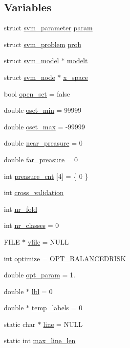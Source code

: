 \subsection*{Variables}
\begin{DoxyCompactItemize}
\item 
struct \hyperlink{structsvm__parameter}{svm\-\_\-parameter} \hyperlink{svm-train_8cpp_abef2e39cc4fa6cc6870dddf9afa2cfad}{param}
\item 
struct \hyperlink{structsvm__problem}{svm\-\_\-problem} \hyperlink{svm-train_8cpp_a3d3cd08abb1a582bcbb3095eb03ed0d6}{prob}
\item 
struct \hyperlink{structsvm__model}{svm\-\_\-model} $\ast$ \hyperlink{svm-train_8cpp_a0b730cfd99e9c8a2ece39a165ebcc5ef}{modelt}
\item 
struct \hyperlink{structsvm__node}{svm\-\_\-node} $\ast$ \hyperlink{svm-train_8cpp_aee6e5726660b16e12499d9bfa6eef01f}{x\-\_\-space}
\item 
bool \hyperlink{svm-train_8cpp_a17843ee1d8102ef588a3f997e827bc70}{open\-\_\-set} = false
\item 
double \hyperlink{svm-train_8cpp_a2bcd8955244b3b5ed1918acc0ce4014e}{oset\-\_\-min} = 99999
\item 
double \hyperlink{svm-train_8cpp_a6a83be17519c65392007b1449d5246e9}{oset\-\_\-max} = -\/99999
\item 
double \hyperlink{svm-train_8cpp_ab569b65ce2e86831530c897a3ad5c901}{near\-\_\-preasure} = 0
\item 
double \hyperlink{svm-train_8cpp_a57ce01656059264c677404c310f3a04e}{far\-\_\-preasure} = 0
\item 
int \hyperlink{svm-train_8cpp_aee8f27d5a82f967da296688aee11c230}{preasure\-\_\-cnt} \mbox{[}4\mbox{]} = \{ 0 \}
\item 
int \hyperlink{svm-train_8cpp_a3ed295b75b08a20ed2bbed4a67f8d18a}{cross\-\_\-validation}
\item 
int \hyperlink{svm-train_8cpp_a8e8ea59d1060e411ced9b25867c66651}{nr\-\_\-fold}
\item 
int \hyperlink{svm-train_8cpp_ad88594354ad0cd1b5f3cebf37f8381cf}{nr\-\_\-classes} = 0
\item 
F\-I\-L\-E $\ast$ \hyperlink{svm-train_8cpp_a32ca8324fdbaa5886494c3794aabb98e}{vfile} = N\-U\-L\-L
\item 
int \hyperlink{svm-train_8cpp_aa33cf9fcdc419d39c5d05fa458bf089a}{optimize} = \hyperlink{_2svm-train_8cpp_a534c2d1c329720ab36237c4d297a2b20}{O\-P\-T\-\_\-\-B\-A\-L\-A\-N\-C\-E\-D\-R\-I\-S\-K}
\item 
double \hyperlink{svm-train_8cpp_aea4397c2cc729e6e21e3eab9b9a2351e}{opt\-\_\-param} = 1.
\item 
double $\ast$ \hyperlink{svm-train_8cpp_a537df30cd5b5b576ee32aeffd22affe2}{lbl} = 0
\item 
double $\ast$ \hyperlink{svm-train_8cpp_a8d832079d5b980f5955dcd7afc689ba9}{temp\-\_\-labels} = 0
\item 
static char $\ast$ \hyperlink{svm-train_8cpp_a8adb30f4f6669f927fd9232f686c637b}{line} = N\-U\-L\-L
\item 
static int \hyperlink{svm-train_8cpp_acad24c15bee67d2026f56bc94a1188c7}{max\-\_\-line\-\_\-len}
\end{DoxyCompactItemize}


